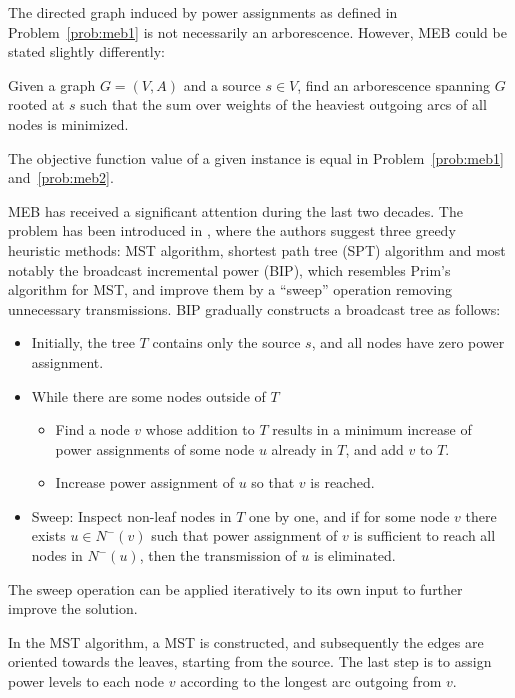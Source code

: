 The directed graph induced by power assignments as defined in Problem~\ref{prob:meb1} is not necessarily an arborescence.
However, MEB could be stated slightly differently:
\begin{problem}\label{prob:meb2}
Given a graph $G=(V,A)$ and a source $s\in V$, find an arborescence spanning $G$ rooted at $s$ such that 
the sum over weights of the heaviest outgoing arcs of all nodes is minimized.
\end{problem}

\begin{observation}
The objective function value of a given instance is equal in Problem~\ref{prob:meb1} and~\ref{prob:meb2}.
\end{observation}

MEB has received a significant attention during the last two decades.
The problem has been introduced in \cite{wieselthier00}, where the authors suggest three greedy heuristic methods:
MST algorithm, shortest path tree (SPT) algorithm and most notably the broadcast incremental power (BIP), which resembles Prim's algorithm for MST,
and improve them by a ``sweep'' operation removing unnecessary transmissions.
BIP gradually constructs a broadcast tree as follows:
\begin{itemize}
\item Initially, the tree $T$ contains only the source $s$, and all nodes have zero power assignment.
\item While there are some nodes outside of $T$
\begin{itemize}
	\item Find a node $v$ whose addition to $T$ results in a minimum increase of power assignments of some node $u$ already in $T$, and add $v$ to $T$.
	\item Increase  power assignment of $u$ so that $v$ is reached.
\end{itemize}
\item Sweep: Inspect non-leaf nodes in $T$ one by one, and if for some node $v$ there exists $u\in N^-(v)$ such that power assignment of $v$ is sufficient to reach all nodes in $N^-(u)$, 
then the transmission of $u$ is eliminated.
\end{itemize}
The sweep operation can be applied iteratively to its own input to further improve the solution.

In the MST algorithm, a MST is constructed, and subsequently the edges are oriented towards the leaves, starting from the source.
The last step is to assign power levels to each node $v$ according to the longest arc outgoing from $v$.

